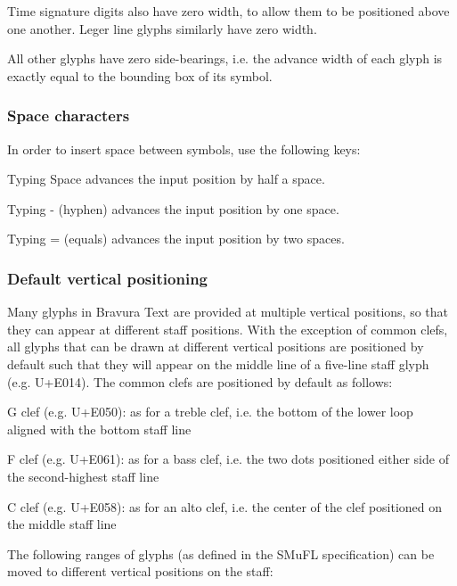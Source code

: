 Time signature digits also have zero width, to allow them to be positioned above one another. Leger line glyphs similarly have zero width.

All other glyphs have zero side-\/bearings, i.\+e. the advance width of each glyph is exactly equal to the bounding box of its symbol.

\subsubsection*{Space characters}

In order to insert space between symbols, use the following keys\+:


\begin{DoxyItemize}
\item Typing {\ttfamily Space} advances the input position by half a space.
\item Typing {\ttfamily -\/} (hyphen) advances the input position by one space.
\item Typing {\ttfamily =} (equals) advances the input position by two spaces.
\end{DoxyItemize}

\subsubsection*{Default vertical positioning}

Many glyphs in Bravura Text are provided at multiple vertical positions, so that they can appear at different staff positions. With the exception of common clefs, all glyphs that can be drawn at different vertical positions are positioned by default such that they will appear on the middle line of a five-\/line staff glyph (e.\+g. U+\+E014). The common clefs are positioned by default as follows\+:


\begin{DoxyItemize}
\item G clef (e.\+g. U+\+E050)\+: as for a treble clef, i.\+e. the bottom of the lower loop aligned with the bottom staff line
\item F clef (e.\+g. U+\+E061)\+: as for a bass clef, i.\+e. the two dots positioned either side of the second-\/highest staff line
\item C clef (e.\+g. U+\+E058)\+: as for an alto clef, i.\+e. the center of the clef positioned on the middle staff line
\end{DoxyItemize}

The following ranges of glyphs (as defined in the S\+Mu\+FL specification) can be moved to different vertical positions on the staff\+:


